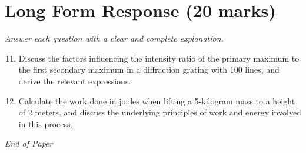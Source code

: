 \documentclass[12pt]{article}
\begin{document}
\section*{Long Form Response (20 marks)}
\textit{Answer each question with a clear and complete explanation.}
\begin{enumerate}[label=\arabic*.]
\setcounter{enumi}{10}
\item Discuss the factors influencing the intensity ratio of the primary maximum to the first secondary maximum in a diffraction grating with 100 lines, and derive the relevant expressions.
\item Calculate the work done in joules when lifting a 5-kilogram mass to a height of 2 meters, and discuss the underlying principles of work and energy involved in this process.
\end{enumerate}

\vfill
\noindent\textit{End of Paper}
\end{document}

